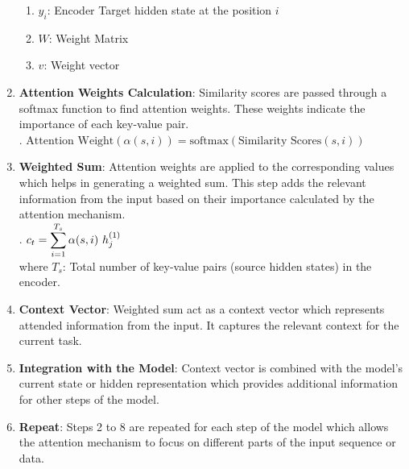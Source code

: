 \begin{enumerate}
\begin{enumerate}
        \item $y_i$: Encoder Target hidden state at the position $i$
        \hfill \cite{geeksforgeeks/artificial-intelligence/ml-attention-mechanism/}

        \item $W$: Weight Matrix
        \hfill \cite{geeksforgeeks/artificial-intelligence/ml-attention-mechanism/}

        \item $v$: Weight vector
        \hfill \cite{geeksforgeeks/artificial-intelligence/ml-attention-mechanism/}
    \end{enumerate}
 
    \item \textbf{Attention Weights Calculation}: Similarity scores are passed through a softmax function to find attention weights. 
    These weights indicate the importance of each key-value pair.
    \hfill \cite{geeksforgeeks/artificial-intelligence/ml-attention-mechanism/}
    \\[0.2cm]
    .\hfill
    $\text{Attention Weight}(\alpha(s,i))=\text{softmax}(\text{Similarity Scores}(s,i))$
    \hfill \cite{geeksforgeeks/artificial-intelligence/ml-attention-mechanism/}

    \item \textbf{Weighted Sum}: Attention weights are applied to the corresponding values which helps in generating a weighted sum. 
    This step adds the relevant information from the input based on their importance calculated by the attention mechanism.
    \hfill \cite{geeksforgeeks/artificial-intelligence/ml-attention-mechanism/}
    \\[0.2cm]
    .\hfill
    $ c_t = \dsum^{T_s}_{i=1} \alpha(s,i)\ h_j^{(1)} $
    \hfill \cite{geeksforgeeks/artificial-intelligence/ml-attention-mechanism/}
    \\
    where $T_s$:  Total number of key-value pairs (source hidden states) in the encoder.
    \hfill \cite{geeksforgeeks/artificial-intelligence/ml-attention-mechanism/}

    \item \textbf{Context Vector}: Weighted sum act as a context vector which represents attended information from the input. It captures the relevant context for the current task. 
    \hfill \cite{geeksforgeeks/artificial-intelligence/ml-attention-mechanism/}

    \item \textbf{Integration with the Model}: Context vector is combined with the model's current state or hidden representation which provides additional information for other steps of the model.
    \hfill \cite{geeksforgeeks/artificial-intelligence/ml-attention-mechanism/}

    \item \textbf{Repeat}: Steps 2 to 8 are repeated for each step of the model which allows the attention mechanism to focus on different parts of the input sequence or data.
    \hfill \cite{geeksforgeeks/artificial-intelligence/ml-attention-mechanism/}
\end{enumerate}





